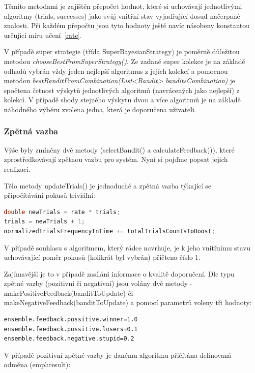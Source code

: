 \documentclass[thesis=M,czech]{FITthesis}[2014/05/07]
\begin{document}
Těmito metodami je zajištěn přepočet hodnot, které si uchovávají jednotlivými algoritmy (trials, successes) jako svůj vnitřní stav vyjadřující dosud načerpané znalosti. Při každém přepočtu jsou tyto hodnoty ještě navíc násobeny konstantou určující míru učení~\ref{rate}.
    
V případě super strategie (třída SuperBayesianStrategy) je poměrně důležitou metodou \emph{chooseBestFromSuperStrategy()}. Ze zadané super kolekce je na základě odhadů vybrán vždy jeden nejlepší algoritmus z jejích kolekcí a pomocnou metodou \emph{bestBanditFromCombination(List<Bandit> banditsCombination)} je spočtena četnost výskytů jednotlivých algoritmů (navrácených jako nejlepší) z kolekcí. V případě shody stejného výskytu dvou a více algoritmů je na základě náhodného výběru zvolena jedna, která je doporučena uživateli.
    
\subsubsection{Zpětná vazba}
\label{implfeedback}     
Výše byly zmíněny dvě metody (selectBandit() a calculateFeedback()), které zprostředkovávají zpětnou vazbu pro systém. Nyní si pojďme popsat jejich realizaci.

Tělo metody updateTrials() je jednoduché a zpětná vazba týkající se připočítávání pokusů triviální:

\begin{lstlisting}[language=java]
double newTrials = rate * trials;
trials = newTrials + 1;
normalizedTrialsFrequencyInTime += totalTrialsCountsToBoost;
\end{lstlisting}	

V případě souhlasu s algoritmem, který rádce navrhuje, je k jeho vnitřnímu stavu uchovávající poměr pokusů (kolikrát byl vybrán) přičteno číslo 1.

Zajímavější je to v případě zasílání informace o kvalitě doporučení. Dle typu zpětné vazby (pozitivní či negativní) jsou volány dvě metody - makePositiveFeedback(banditToUpdate) či makeNegativeFeedback(banditToUpdate) a pomocí parametrů voleny tři hodnoty:

\begin{verbatim}
ensemble.feedback.possitive.winner=1.0
ensemble.feedback.possitive.losers=0.1
ensemble.feedback.negative.stupid=0.2
\end{verbatim}

V případě pozitivní zpětné vazby je danému algoritmu přičítána definovaná odměna (emph{result}):
\end{document}
